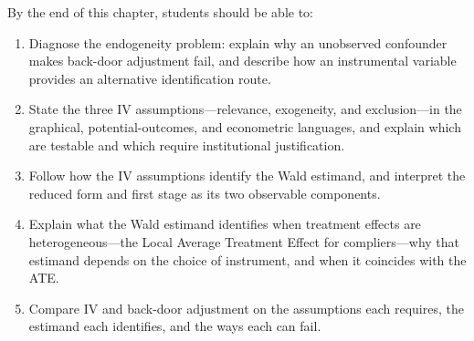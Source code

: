 \documentclass[master.tex]{subfiles}
\begin{document}

\begin{tcolorbox}[defstyle, title={Learning Objectives}]
By the end of this chapter, students should be able to:
\begin{enumerate}
  \item Diagnose the endogeneity problem: explain why an unobserved
    confounder makes back-door adjustment fail, and describe how an
    instrumental variable provides an alternative identification
    route.
  \item State the three IV assumptions---relevance, exogeneity, and
    exclusion---in the graphical, potential-outcomes, and
    econometric languages, and explain which are testable and which
    require institutional justification.
  \item Follow how the IV assumptions identify the Wald estimand,
    and interpret the reduced form and first stage as its two
    observable components.
  \item Explain what the Wald estimand identifies when treatment
    effects are heterogeneous---the Local Average Treatment Effect
    for compliers---why that estimand depends on the choice of
    instrument, and when it coincides with the ATE.
  \item Compare IV and back-door adjustment on the assumptions each
    requires, the estimand each identifies, and the ways each can
    fail.
\end{enumerate}
\end{tcolorbox}
\end{document}
